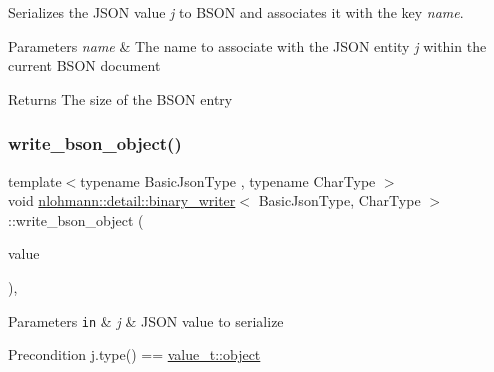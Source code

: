 Serializes the J\+S\+ON value {\itshape j} to B\+S\+ON and associates it with the key {\itshape name}. 


\begin{DoxyParams}{Parameters}
{\em name} & The name to associate with the J\+S\+ON entity {\itshape j} within the current B\+S\+ON document \\
\hline
\end{DoxyParams}
\begin{DoxyReturn}{Returns}
The size of the B\+S\+ON entry 
\end{DoxyReturn}
\mbox{\label{classnlohmann_1_1detail_1_1binary__writer_a29b3e0f83a8e5f2307804023109ba2c9}} 
\subsubsection{\texorpdfstring{write\+\_\+bson\+\_\+object()}{write\_bson\_object()}}
{\footnotesize\ttfamily template$<$typename Basic\+Json\+Type , typename Char\+Type $>$ \\
void \mbox{\hyperlink{classnlohmann_1_1detail_1_1binary__writer}{nlohmann\+::detail\+::binary\+\_\+writer}}$<$ Basic\+Json\+Type, Char\+Type $>$\+::write\+\_\+bson\+\_\+object (\begin{DoxyParamCaption}\item[{const typename Basic\+Json\+Type\+::object\+\_\+t \&}]{value }\end{DoxyParamCaption})\hspace{0.3cm}{\ttfamily [inline]}, {\ttfamily [private]}}


\begin{DoxyParams}[1]{Parameters}
\mbox{\tt in}  & {\em j} & J\+S\+ON value to serialize \\
\hline
\end{DoxyParams}
\begin{DoxyPrecond}{Precondition}
j.\+type() == \mbox{\hyperlink{namespacenlohmann_1_1detail_a1ed8fc6239da25abcaf681d30ace4985aa8cfde6331bd59eb2ac96f8911c4b666}{value\+\_\+t\+::object}} 
\end{DoxyPrecond}
\mbox{\label{classnlohmann_1_1detail_1_1binary__writer_aa0ab8d27fd88a33a2f801413ac4c7fbc}} 
